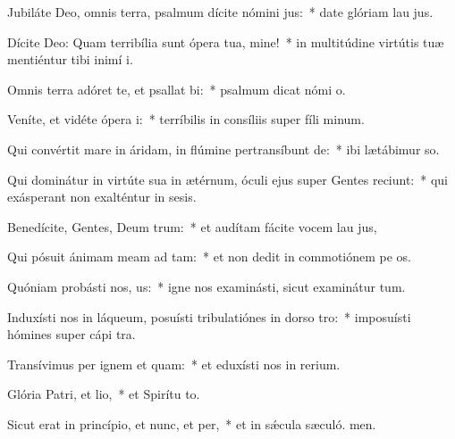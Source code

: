 \item Jubiláte Deo, omnis terra, psalmum dícite nómini jus:~* date glóriam lau jus.
\item Dícite Deo: Quam terribília sunt ópera tua, mine!~* in multitúdine virtútis tuæ mentiéntur tibi inimí i.
\item Omnis terra adóret te, et psallat bi:~* psalmum dicat nómi o.
\item Veníte, et vidéte ópera i:~* terríbilis in consíliis super fíli minum.
\item Qui convértit mare in áridam, in flúmine pertransíbunt de:~* ibi lætábimur  so.
\item Qui dominátur in virtúte sua in ætérnum, óculi ejus super Gentes reciunt:~* qui exásperant non exalténtur in sesis.
\item Benedícite, Gentes, Deum trum:~* et audítam fácite vocem lau jus,
\item Qui pósuit ánimam meam ad tam:~* et non dedit in commotiónem pe os.
\item Quóniam probásti nos, us:~* igne nos examinásti, sicut examinátur tum.
\item Induxísti nos in láqueum, posuísti tribulatiónes in dorso tro:~* imposuísti hómines super cápi tra.
\item Transívimus per ignem et quam:~* et eduxísti nos in rerium.
\item Glória Patri, et lio,~* et Spirítu to.
\item Sicut erat in princípio, et nunc, et per,~* et in sǽcula sæculó. men.
